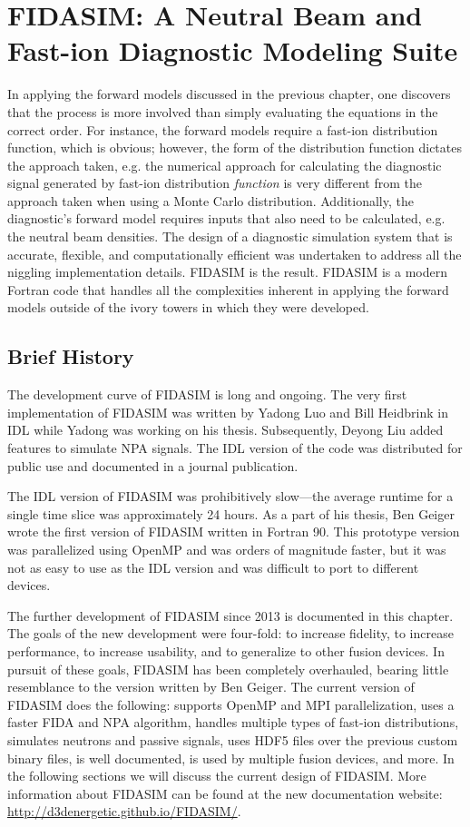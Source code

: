 \chapter{FIDASIM: A Neutral Beam and Fast-ion Diagnostic Modeling Suite}\label{chap:fidasim}
In applying the forward models discussed in the previous chapter, one discovers that the process is more involved than simply evaluating the equations in the correct order. For instance, the forward models require a fast-ion distribution function, which is obvious; however, the form of the distribution function dictates the approach taken, e.g. the numerical approach for calculating the diagnostic signal generated by fast-ion distribution \textit{function} is very different from the approach taken when using a Monte Carlo distribution. Additionally, the diagnostic's forward model requires inputs that also need to be calculated, e.g. the neutral beam densities. The design of a diagnostic simulation system that is accurate, flexible, and computationally efficient was undertaken to address all the niggling implementation details. FIDASIM is the result. FIDASIM is a modern Fortran code that handles all the complexities inherent in applying the forward models outside of the ivory towers in which they were developed.  

\section{Brief History}
The development curve of FIDASIM is long and ongoing. 
The very first implementation of FIDASIM was written by Yadong Luo and Bill Heidbrink in IDL while Yadong was working on his thesis\cite{luo2007thesis}. Subsequently, Deyong Liu added features to simulate NPA signals. The IDL version of the code was distributed for public use and documented in a journal publication\cite{heidbrink2011code}.

The IDL version of FIDASIM was prohibitively slow---the average runtime for a single time slice was approximately 24 hours. As a part of his thesis\cite{geiger2013thesis}, Ben Geiger wrote the first version of FIDASIM written in Fortran 90. This prototype version was parallelized using OpenMP and was orders of magnitude faster, but it was not as easy to use as the IDL version and was difficult to port to different devices.

The further development of FIDASIM since 2013 is documented in this chapter. The goals of the new development were four-fold: to increase fidelity, to increase performance, to increase usability, and to generalize to other fusion devices. In pursuit of these goals, FIDASIM has been completely overhauled, bearing little resemblance to the version written by Ben Geiger. The current version of FIDASIM does the following: supports OpenMP and MPI parallelization, uses a faster FIDA and NPA algorithm, handles multiple types of fast-ion distributions, simulates neutrons and passive signals, uses HDF5 files over the previous custom binary files, is well documented, is used by multiple fusion devices, and more. In the following sections we will discuss the current design of FIDASIM. More information about FIDASIM can be found at the new documentation website: \url{http://d3denergetic.github.io/FIDASIM/}.


